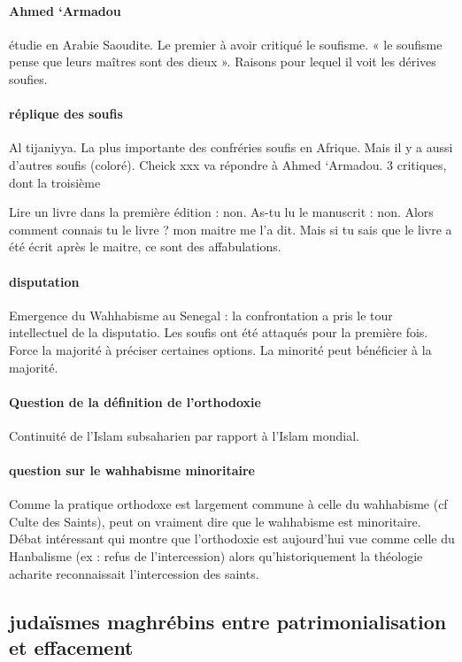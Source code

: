 \paragraph{Ahmed ‘Armadou} étudie en Arabie Saoudite. Le premier à avoir critiqué le soufisme. « le soufisme pense que leurs maîtres sont des dieux ». Raisons pour lequel il voit les dérives soufies. 
\paragraph{réplique des soufis} Al tijaniyya. La plus importante des confréries soufis en Afrique. Mais il y a aussi d’autres soufis (coloré).  Cheick xxx va répondre à Ahmed ‘Armadou. 3 critiques, dont la troisième
\begin{Ex}
  Lire un livre dans la première édition : non. As-tu lu le manuscrit : non. Alors comment connais tu le livre ? mon maitre me l’a dit. Mais si tu sais que le livre a été écrit après le maitre, ce sont des affabulations. 
\end{Ex} 

\paragraph{disputation} Emergence du Wahhabisme au Senegal : la confrontation a pris le tour intellectuel de la disputatio. Les soufis ont été attaqués pour la première fois. Force la majorité à préciser certaines options. La minorité peut bénéficier à la majorité. 

\paragraph{Question de la définition de l’orthodoxie} Continuité de l’Islam subsaharien par rapport à l’Islam mondial.

\paragraph{question sur le wahhabisme minoritaire} Comme la pratique orthodoxe est largement commune à celle du wahhabisme (cf Culte des Saints), peut on vraiment dire que le wahhabisme est minoritaire. 
Débat intéressant qui montre que l’orthodoxie est aujourd’hui vue comme celle du Hanbalisme (ex : refus de l’intercession) alors qu’historiquement la théologie acharite reconnaissait l’intercession des saints. 


\subsection{judaïsmes maghrébins entre patrimonialisation et effacement}

